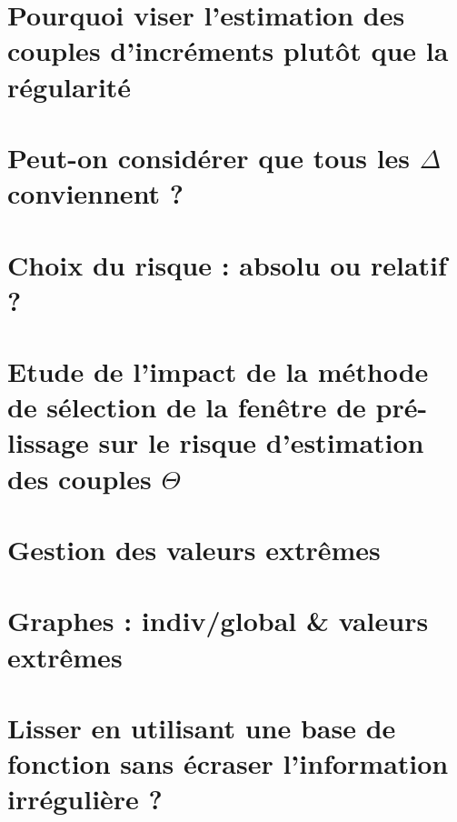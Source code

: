 
\minitoc%

\section{Pourquoi viser l'estimation des couples d'incréments plutôt que la régularité}
\label{annexe:choix_risque_couple}


\section[Peut-on considérer que tous les delta conviennent ?]{Peut-on considérer que tous les $\Delta$ conviennent ?}
\label{annexe:tous_theta_conviennent_borne_norme_theta}


\section{Choix du risque : absolu ou relatif ?}
\label{annexe:choix-du-rique}


\section[{Etude de l'impact de la méthode de sélection de la fenêtre de pré-lissage sur le risque d'estimation des couples THETA}]{Etude de l'impact de la méthode de sélection de la fenêtre de pré-lissage sur le risque d'estimation des couples $\Theta$}




\section{Gestion des valeurs extrêmes}

\section{Graphes : indiv/global \& valeurs extrêmes}
\pagebreak


\section{Lisser en utilisant une base de fonction sans écraser l'information irrégulière ?}
\label{annexe:lissage_base_fcn}


